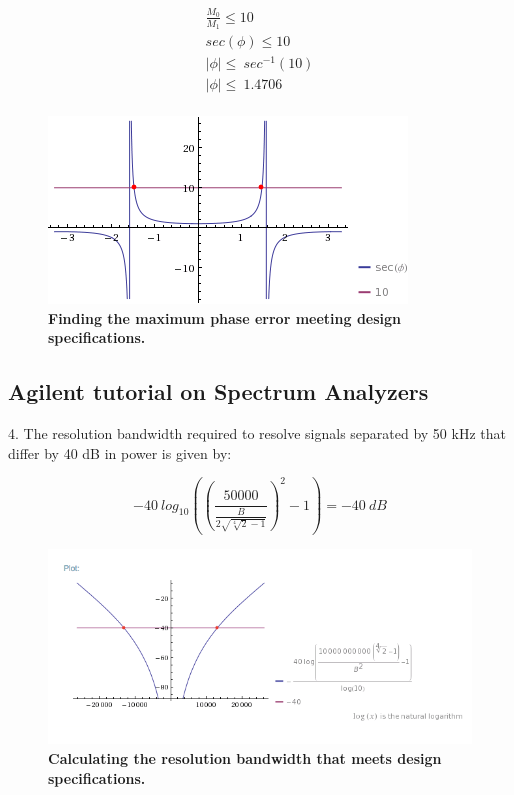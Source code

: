 \documentclass[letterpaper,12pt]{article}
\begin{document}
\begin{equation}
\begin{split}
\frac{M_{0}}{M_{1}}\leq10 \\
sec(\phi)\leq10 \\
|\phi|\leq\ sec^{-1}(10) \\
|\phi|\leq\ 1.4706 \\
\end{split}
\end{equation}

\begin{figure}[hbtp]
\includegraphics[width=0.5\columnwidth]{prelab1-figure3}
\caption{
\label{fig:prelab1-figure3}
{\bf Finding the maximum phase error meeting design specifications.
}
}
\end{figure}

\pagebreak

\subsection*{Agilent tutorial on Spectrum Analyzers}

4. The resolution bandwidth required to resolve signals separated by 50 kHz that
differ by 40 dB in power is given by:

\begin{equation}
-40\ log_{10}\left(\left(\frac{50000}{\frac{B}{2\sqrt{\sqrt[4]{2}-1}}}\right)^2 - 1\right) = -40\ dB
\end{equation}

\begin{figure}[hbtp]
\includegraphics[width=1.0\columnwidth]{prelab1-figure4}
\caption{
\label{fig:prelab1-figure4}
{\bf Calculating the resolution bandwidth that meets design specifications.
}
}
\end{figure}
\end{document}
